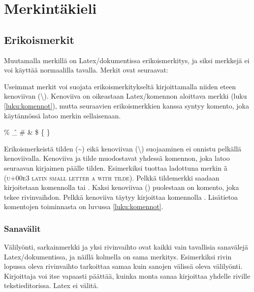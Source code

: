 \chapter{Merkintäkieli}

\section{Erikoismerkit}

Muutamalla merkillä on Latex\-/dokumentissa erikoismerkitys, ja siksi
merkkejä ei voi käyttää normaalilla tavalla. Merkit ovat seuraavat:

\begin{koodilohkosis}
\end{koodilohkosis}

Useimmat merkit voi suojata erikoismerkitykseltä kirjoittamalla niiden
eteen kenoviivan (\textbackslash). Kenoviiva on oikeastaan
Latex\-/komennon aloittava merkki (luku \ref{luku:komennot}), mutta
seuraavien erikoismerkkien kanssa syntyy komento, joka käytännössä latoo
merkin sellaisenaan.

\begin{koodilohkosis}
  \% \^ \_ \# \& \$ \{ \}
\end{koodilohkosis}

Erikoismerkeistä tilden (\textasciitilde) eikä kenoviivan
(\textbackslash) suojaaminen ei onnistu pelkällä kenoviivalla. Kenoviiva
ja tilde muodostavat yhdessä komennon, joka latoo seuraavan kirjaimen
päälle tilden. Esimerkiksi 
tuottaa ladottuna merkin \~a (\textsc{u+00e3 \textenglish{latin small
    letter a with tilde}}). Pelkkä tildemerkki saadaan kirjoitetaan
komennolla \koodi{\textbackslash\textasciitilde\{\}} tai . Kaksi kenoviivaa (\koodi{\keno\keno}) puolestaan on
komento, joka tekee rivinvaihdon. Pelkkä kenoviiva täytyy kirjoittaa
komennolla . Lisätietoa komentojen
toiminnasta on luvussa \ref{luku:komennot}.


\subsection{Sanavälit}

Välilyönti, sarkainmerkki ja yksi rivinvaihto ovat kaikki vain
tavallisia sanavälejä Latex\-/dokumentissa, ja näillä kolmella on sama
merkitys. Esimerkiksi rivin lopussa oleva rivinvaihto tarkoittaa samaa
kuin sanojen välissä oleva välilyönti. Kirjoittaja voi itse vapaasti
päättää, kuinka monta sanaa kirjoittaa yhdelle riville tekstieditorissa.
Latex ei välitä.

